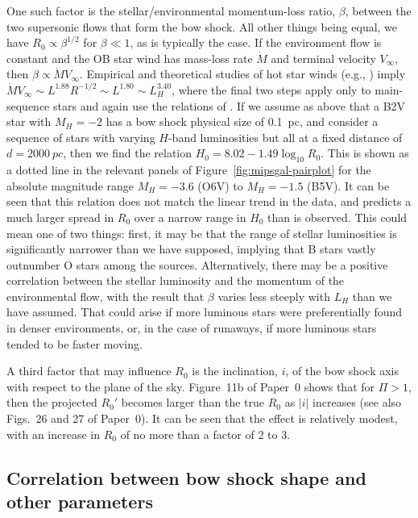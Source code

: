 One such factor is the stellar/environmental momentum-loss ratio,
\(\beta\), between the two supersonic flows that form the bow shock.  All
other things being equal, we have \(R_0 \propto \beta^{1/2}\) for
\(\beta \ll 1\), as is typically the case.  If the environment flow is
constant and the OB star wind has mass-loss rate \(\dot{M}\) and
terminal velocity \(V_\infty\), then
\(\beta \propto \dot{M}{V_\infty}\).  Empirical and theoretical studies of hot star
winds (e.g., \citealp{Puls:1996a}) imply
\(\dot{M}{V_\infty} \sim L^{1.88} R^{-1/2} \sim L^{1.80} \sim L_H^{3.40}\), where
the final two steps apply only to main-sequence stars and again use
the relations of \citet{Eker:2015a}.  If we assume as above that a B2V
star with \(M_H = -2\) has a bow shock physical size of \SI{0.1}{pc},
and consider a sequence of stars with varying \(H\)-band luminosities
but all at a fixed distance of \(d = \SI{2000}{pc}\), then we find the
relation \(H_0 = 8.02 - 1.49 \log_{10} R_0\).  This is shown as a
dotted line in the relevant panels of
Figure~\ref{fig:mipsgal-pairplot} for the absolute magnitude range
\(M_H = -3.6\) (O6V) to \(M_H = -1.5\) (B5V).  It can be seen that
this relation does not match the linear trend in the data, and
predicts a much larger spread in \(R_0\) over a narrow range in
\(H_0\) than is observed.  This could mean one of two things: first,
it may be that the range of stellar luminosities is significantly
narrower than we have supposed, implying that B stars vastly outnumber
O stars among the sources.  Alternatively, there may be a positive
correlation between the stellar luminosity and the momentum of the
environmental flow, with the result that \(\beta\) varies less steeply
with \(L_H\) than we have assumed.  That could arise if more luminous
stars were preferentially found in denser environments, or, in the
case of runaways, if more luminous stars tended to be faster moving.

A third factor that may influence \(R_0\) is the inclination, \(i\),
of the bow shock axis with respect to the plane of the sky.
Figure~11b of Paper~0 shows that for \(\Pi > 1\), then the projected
\(R_0'\) becomes larger than the true \(R_0\) as \(|i|\) increases
(see also Figs.~26 and 27 of Paper~0).  It can be seen that the effect
is relatively modest, with an increase in \(R_0\) of no more than a
factor of 2 to 3.


\subsection{Correlation between bow shock shape and other parameters}
\label{sec:corr-shape}

